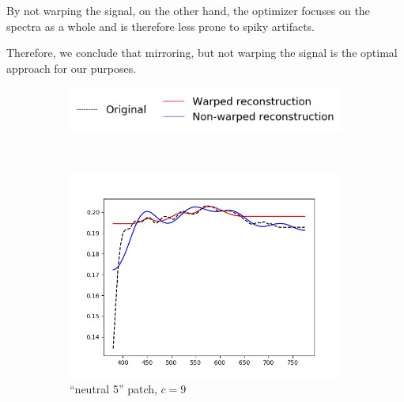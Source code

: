 By not warping the signal, on the other hand, the optimizer focuses on the spectra as a whole and is therefore less prone to spiky artifacts.

Therefore, we conclude that mirroring, but not warping the signal is the optimal approach for our purposes.

\begin{figure}[t]
	\centering
	\captionsetup[subfigure]{font=footnotesize,labelfont=footnotesize}
	\captionsetup[subfigure]{justification=centering}
	\begin{subfigure}[t]{0.60\textwidth}
		\includegraphics[width=\linewidth]{img/results_techniqueLegend.png}
	\end{subfigure} \\
	\begin{subfigure}[t]{0.45\textwidth}
		\includegraphics[width=\linewidth]{img/results_techniqueNeutral5.png}
		\caption{``neutral 5'' patch, $c = 9$}
		\label{fig:resultsWarping_neutral5}
	\end{subfigure} \hspace{0.1em}
	\begin{subfigure}[t]{0.45\textwidth}

\end{subfigure}
\end{figure}
